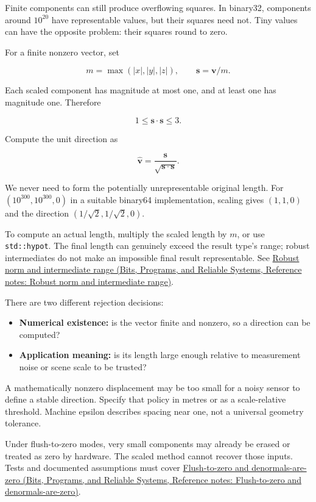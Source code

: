 Finite components can still produce overflowing squares. In binary32, components around \(10^{20}\) have representable values, but their squares need not. Tiny values can have the opposite problem: their squares round to zero.

For a finite nonzero vector, set

\[
m=\max(|x|,|y|,|z|),\qquad
\mathbf s=\mathbf v/m.
\]

Each scaled component has magnitude at most one, and at least one has magnitude one. Therefore

\[
1\le\mathbf s\cdot\mathbf s\le3.
\]

Compute the unit direction as

\[
\widehat{\mathbf v}=\frac{\mathbf s}{\sqrt{\mathbf s\cdot\mathbf s}}.
\]

We never need to form the potentially unrepresentable original length. For \((10^{300},10^{300},0)\) in a suitable binary64 implementation, scaling gives \((1,1,0)\) and the direction \((1/\sqrt2,1/\sqrt2,0)\).

To compute an actual length, multiply the scaled length by \(m\), or use \texttt{std::hypot}. The final length can genuinely exceed the result type's range; robust intermediates do not make an impossible final result representable. See \href{../01-Bits-Programs-and-Reliable-Systems/main.pdf\#nameddest=appendix-7f1e17dcafb1}{Robust norm and intermediate range (Bits, Programs, and Reliable Systems, Reference notes: Robust norm and intermediate range)}.

There are two different rejection decisions:

\begin{itemize}
\tightlist
\item
  \textbf{Numerical existence:} is the vector finite and nonzero, so a direction can be computed?
\item
  \textbf{Application meaning:} is its length large enough relative to measurement noise or scene scale to be trusted?
\end{itemize}

A mathematically nonzero displacement may be too small for a noisy sensor to define a stable direction. Specify that policy in metres or as a scale-relative threshold. Machine epsilon describes spacing near one, not a universal geometry tolerance.

Under flush-to-zero modes, very small components may already be erased or treated as zero by hardware. The scaled method cannot recover those inputs. Tests and documented assumptions must cover \href{../01-Bits-Programs-and-Reliable-Systems/main.pdf\#nameddest=appendix-e979eb012782}{Flush-to-zero and denormals-are-zero (Bits, Programs, and Reliable Systems, Reference notes: Flush-to-zero and denormals-are-zero)}.


